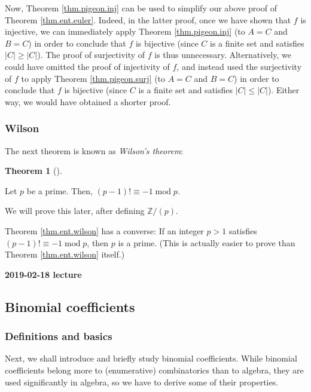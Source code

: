 \documentclass[numbers=enddot,12pt,final,onecolumn,notitlepage]{scrartcl}%
\numberwithin{exer}{subsection}
\theoremstyle{definition}
\newtheorem{theo}{Theorem}[subsection]
\newenvironment{theorem}[1][]
{\begin{theo}[#1]\begin{leftbar}}
{\end{leftbar}\end{theo}}
\begin{document}
Now, Theorem \ref{thm.pigeon.inj} can be used to simplify our above proof of
Theorem \ref{thm.ent.euler}. Indeed, in the latter proof, once we have shown
that $f$ is injective, we can immediately apply Theorem \ref{thm.pigeon.inj}
(to $A=C$ and $B=C$) in order to conclude that $f$ is bijective (since $C$ is
a finite set and satisfies $\left\vert C\right\vert \geq\left\vert
C\right\vert $). The proof of surjectivity of $f$ is thus unnecessary.
Alternatively, we could have omitted the proof of injectivity of $f$, and
instead used the surjectivity of $f$ to apply Theorem \ref{thm.pigeon.surj}
(to $A=C$ and $B=C$) in order to conclude that $f$ is bijective (since $C$ is
a finite set and satisfies $\left\vert C\right\vert \leq\left\vert
C\right\vert $). Either way, we would have obtained a shorter proof.

\subsubsection{Wilson}

The next theorem is known as \textit{Wilson's theorem}:

\begin{theorem}
\label{thm.ent.wilson}Let $p$ be a prime. Then, $\left(  p-1\right)
!\equiv-1\operatorname{mod}p$.
\end{theorem}

We will prove this later, after defining $\mathbb{Z}/\left(  p\right)  $.

Theorem \ref{thm.ent.wilson} has a converse: If an integer $p>1$ satisfies
$\left(  p-1\right)  !\equiv-1\operatorname{mod}p$, then $p$ is a prime. (This
is actually easier to prove than Theorem \ref{thm.ent.wilson} itself.)

\begin{center}
\textbf{2019-02-18 lecture}
\end{center}

\subsection{Binomial coefficients}

\subsubsection{Definitions and basics}

Next, we shall introduce and briefly study binomial coefficients. While
binomial coefficients belong more to (enumerative) combinatorics than to
algebra, they are used significantly in algebra, so we have to derive some of
their properties.
\end{document}
